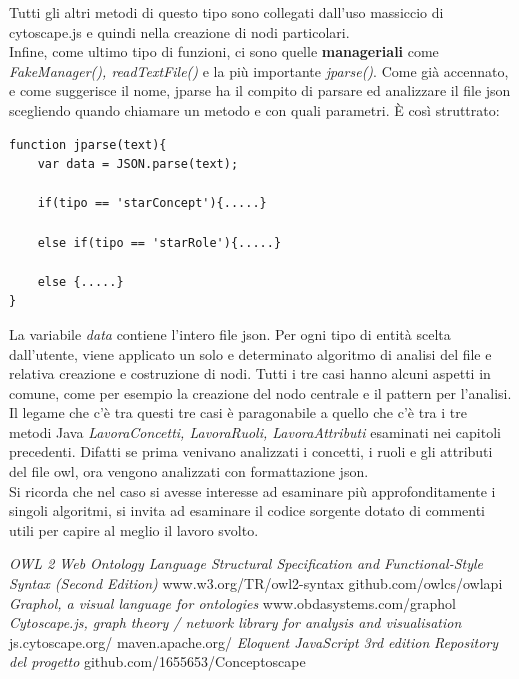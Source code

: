 \documentclass[Lau,binding=0.6cm]{sapthesis}
\begin{document}
Tutti gli altri metodi di questo tipo sono collegati dall'uso massiccio di cytoscape.js e quindi nella creazione di nodi particolari.
\\Infine, come ultimo tipo di funzioni, ci sono quelle \textbf{manageriali} come \textit{FakeManager(), readTextFile()} e la più importante \textit{jparse()}.
Come già accennato, e come suggerisce il nome, jparse ha il compito di parsare ed analizzare il file json scegliendo quando chiamare un metodo e con quali parametri.
È così struttrato:
\begin{verbatim}
function jparse(text){
    var data = JSON.parse(text);
    
    if(tipo == 'starConcept'){.....}
    
    else if(tipo == 'starRole'){.....}
    
    else {.....}
}

\end{verbatim}
La variabile \textit{data} contiene l'intero file json. Per ogni tipo di entità scelta dall'utente, viene applicato un solo e determinato algoritmo di analisi del file e relativa creazione e costruzione di nodi. Tutti i tre casi hanno alcuni aspetti in comune, come per esempio la creazione del nodo centrale e il pattern per l'analisi. Il legame che c'è tra questi tre casi è paragonabile a quello che c'è tra i tre metodi Java \textit{LavoraConcetti, LavoraRuoli, LavoraAttributi} esaminati nei capitoli precedenti. Difatti se prima venivano analizzati i concetti, i ruoli e gli attributi del file owl, ora vengono analizzati con formattazione json.
\\Si ricorda che nel caso si avesse interesse ad esaminare più approfonditamente i singoli algoritmi, si invita ad esaminare il codice sorgente dotato di commenti utili per capire al meglio il lavoro svolto.

\begin{thebibliography}{Tesi}
		\emph{OWL 2 Web Ontology Language 
Structural Specification and Functional-Style Syntax (Second Edition)}  www.w3.org/TR/owl2-syntax 
		 github.com/owlcs/owlapi
		 \emph{Graphol, a visual language for ontologies}  www.obdasystems.com/graphol
		 \emph{Cytoscape.js, graph theory / network library for analysis and visualisation} js.cytoscape.org/
		 maven.apache.org/
		 \emph{Eloquent JavaScript 3rd edition}
		\bibitem{} \emph{Repository del progetto} github.com/1655653/Conceptoscape
\end{thebibliography}




\backmatter
\end{document}
